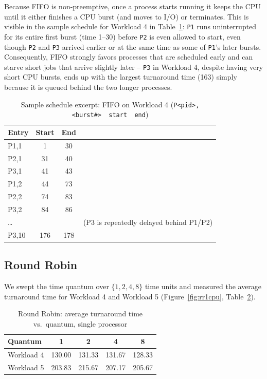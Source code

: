 \documentclass[11pt]{article}
\begin{document}
Because FIFO is non-preemptive, once a process starts running it keeps the
CPU until it either finishes a CPU burst (and moves to I/O) or terminates.
This is visible in the sample schedule for Workload 4 in
Table~\ref{tab:sample-schedule}: \texttt{P1} runs uninterrupted for its
entire first burst (time 1--30) before \texttt{P2} is even allowed to start,
even though \texttt{P2} and \texttt{P3} arrived earlier or at the same time
as some of \texttt{P1}'s later bursts. Consequently, FIFO strongly favors
processes that are scheduled early and can starve short jobs that arrive
slightly later -- \texttt{P3} in Workload 4, despite having very short CPU
bursts, ends up with the largest turnaround time (163) simply because it is
queued behind the two longer processes.

\begin{table}[H]
\centering
\caption{Sample schedule excerpt: FIFO on Workload 4 (\texttt{P<pid>,<burst\#>\ \ start\ \ end})}
\label{tab:sample-schedule}
\begin{tabular}{lccc}
\toprule
Entry & Start & End & \\
\midrule
P1,1 & 1   & 30  \\
P2,1 & 31  & 40  \\
P3,1 & 41  & 43  \\
P1,2 & 44  & 73  \\
P2,2 & 74  & 83  \\
P3,2 & 84  & 86  \\
\ldots & & & (P3 is repeatedly delayed behind P1/P2) \\
P3,10& 176 & 178 \\
\bottomrule
\end{tabular}
\end{table}

\subsection{Round Robin}
We swept the time quantum over $\{1, 2, 4, 8\}$ time units and measured the
average turnaround time for Workload 4 and Workload 5
(Figure~\ref{fig:rr1cpu}, Table~\ref{tab:rr1cpu}).

\begin{table}[H]
\centering
\caption{Round Robin: average turnaround time vs.\ quantum, single processor}
\label{tab:rr1cpu}
\begin{tabular}{lcccc}
\toprule
Quantum & 1 & 2 & 4 & 8 \\
\midrule
Workload 4 & 130.00 & 131.33 & 131.67 & 128.33 \\
Workload 5 & 203.83 & 215.67 & 207.17 & 205.67 \\
\bottomrule
\end{tabular}
\end{table}
\end{document}
